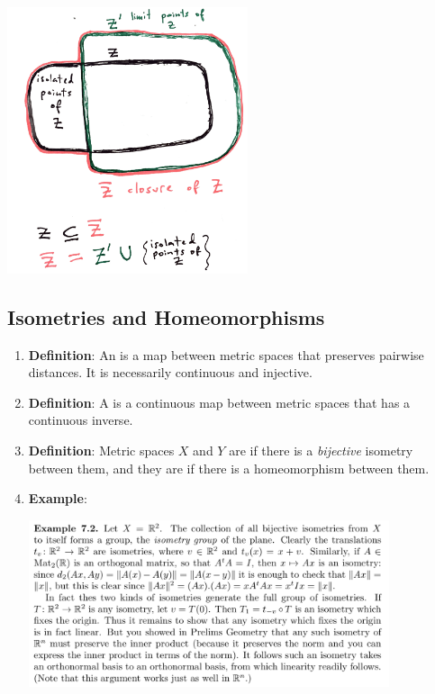\begin{mdframed}
\includegraphics[width=200pt]{img/metric-space-closure-limit-points.png}
\end{mdframed}


\newpage
\subsection{Isometries and Homeomorphisms}
\begin{enumerate}
\item {\bf Definition}: An  is a map between metric spaces that preserves pairwise distances. It is
  necessarily continuous and injective.
\item {\bf Definition}: A  is a continuous map between metric spaces that has a
  continuous inverse.
\item {\bf Definition}: Metric spaces $X$ and $Y$ are  if there is a {\it
    bijective} isometry between them, and they are  if there is a homeomorphism
  between them.
\item {\bf Example}:
  \begin{mdframed}
    \includegraphics[width=300pt]{img/oxford-a2-isometry-group.png}
  \end{mdframed}
\end{enumerate}


